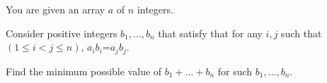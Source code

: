 You are given an array $a$ of $n$ integers.

Consider positive integers $b_1$$,\dots,$$b_n$ that satisfy that for any $i,j$ such that $(1\le i < j \le n)$, $a_i$$b_i$=$a_jb_j$.

Find the minimum possible value of 
$b_1 +\dots+ b_n$ for such $b_1,\dots,b_n$.
